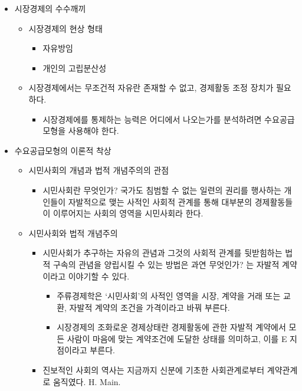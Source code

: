 \documentclass{report}
\begin{document}
\begin{itemize}
    \item 시장경제의 수수깨끼
    \begin{itemize}
        \item 시장경제의 현상 형태
        \begin{itemize}
            \item 자유방임
            \item 개인의 고립분산성
        \end{itemize}
        \item 시장경제에서는 무조건적 자유란 존재할 수 없고, 경제활동 조정 장치가 필요하다.
        \begin{itemize}
            \item 시장경제에를 통제하는 능력은 어디에서 나오는가를 분석하려면 수요공급모형을 사용해야 한다.
        \end{itemize}
    \end{itemize}
    \item 수요공급모형의 이론적 착상
    \begin{itemize}
        \item 시민사회의 개념과 법적 개념주의의 관점
        \begin{itemize}
            \item 시민사회란 무엇인가? 국가도 침범할 수 없는 일련의 권리를 행사하는 개인들이 자발적으로 맺는 사적인 사회적 관계를 통해 대부분의 경제활동들이 이루어지는 사회의 영역을 시민사회라 한다.
        \end{itemize}
        \item 시민사회와 법적 개념주의
        \begin{itemize}
            \item 시민사회가 추구하는 자유의 관념과 그것의 사회적 관계를 뒷받힘하는 법적 구속의 관념을 양립시킬 수 있는 방법은 과연 무엇인가? 는 자발적 계약이라고 이야기할 수 있다.
            \begin{itemize}
                \item 주류경제학은 `시민사회'의 사적인 영역을 시장, 계약을 거래 또는 교환, 자발적 계약의 조건을 가격이라고 바꿔 부른다.
                \item 시장경제의 조화로운 경제상태란 경제활동에 관한 자발적 계약에서 모든 사람이 마음에 맞는 계약조건에 도달한 상태를 의미하고, 이를 E 지점이라고 부른다.
            \end{itemize}
            \item 진보적인 사회의 역사는 지금까지 신분에 기초한 사회관계로부터 계약관계로 움직였다. H. Main.
        \end{itemize}

\end{itemize}
\end{itemize}
\end{document}
